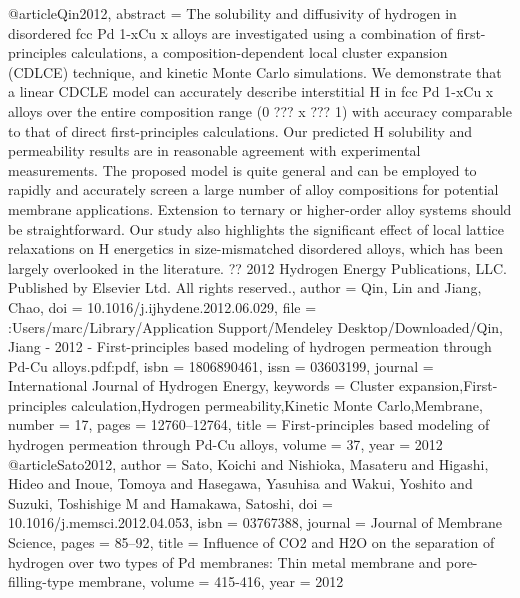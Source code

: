 @article{Qin2012,
abstract = {The solubility and diffusivity of hydrogen in disordered fcc Pd 1-xCu x alloys are investigated using a combination of first-principles calculations, a composition-dependent local cluster expansion (CDLCE) technique, and kinetic Monte Carlo simulations. We demonstrate that a linear CDCLE model can accurately describe interstitial H in fcc Pd 1-xCu x alloys over the entire composition range (0 ??? x ??? 1) with accuracy comparable to that of direct first-principles calculations. Our predicted H solubility and permeability results are in reasonable agreement with experimental measurements. The proposed model is quite general and can be employed to rapidly and accurately screen a large number of alloy compositions for potential membrane applications. Extension to ternary or higher-order alloy systems should be straightforward. Our study also highlights the significant effect of local lattice relaxations on H energetics in size-mismatched disordered alloys, which has been largely overlooked in the literature. ?? 2012 Hydrogen Energy Publications, LLC. Published by Elsevier Ltd. All rights reserved.},
author = {Qin, Lin and Jiang, Chao},
doi = {10.1016/j.ijhydene.2012.06.029},
file = {:Users/marc/Library/Application Support/Mendeley Desktop/Downloaded/Qin, Jiang - 2012 - First-principles based modeling of hydrogen permeation through Pd-Cu alloys.pdf:pdf},
isbn = {1806890461},
issn = {03603199},
journal = {International Journal of Hydrogen Energy},
keywords = {Cluster expansion,First-principles calculation,Hydrogen permeability,Kinetic Monte Carlo,Membrane},
number = {17},
pages = {12760--12764},
title = {{First-principles based modeling of hydrogen permeation through Pd-Cu alloys}},
volume = {37},
year = {2012}
}
@article{Sato2012,
author = {Sato, Koichi and Nishioka, Masateru and Higashi, Hideo and Inoue, Tomoya and Hasegawa, Yasuhisa and Wakui, Yoshito and Suzuki, Toshishige M and Hamakawa, Satoshi},
doi = {10.1016/j.memsci.2012.04.053},
isbn = {03767388},
journal = {Journal of Membrane Science},
pages = {85--92},
title = {{Influence of CO2 and H2O on the separation of hydrogen over two types of Pd membranes: Thin metal membrane and pore-filling-type membrane}},
volume = {415-416},
year = {2012}
}
